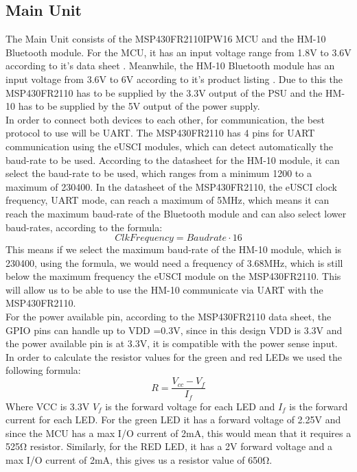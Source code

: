 \subsection{Main Unit}The Main Unit consists of the MSP430FR2110IPW16 MCU and the HM-10 Bluetooth module. For the MCU, it has an input voltage range from 1.8\si{\V} to 3.6\si{\V} according to it's data sheet \cite{MSP430FR2110IPW16R}. Meanwhile, the HM-10 Bluetooth module has an input voltage from 3.6\si{\V} to 6\si{\V} according to it's product listing \cite{AmazonComHiLetgo}. Due to this the MSP430FR2110 has to be supplied by the 3.3\si{V} output of the PSU and the HM-10 has to be supplied by the 5\si{\V} output of the power supply.\\
In order to connect both devices to each other, for communication, the best protocol to use will be UART. The MSP430FR2110 has 4 pins for UART communication using the eUSCI modules, which can detect automatically the baud-rate to be used. According to the datasheet for the HM-10 module\cite{AmazonComHiLetgo}, it can select the baud-rate to be used, which ranges from a minimum 1200 to a maximum of 230400. In the datasheet of the MSP430FR2110, the eUSCI clock frequency, UART mode, can reach a maximum of 5MHz, which means it can reach the maximum baud-rate of the Bluetooth module and can also select lower baud-rates, according to the formula:
\begin{equation}
	Clk Frequency = Baudrate \cdot 16
	\label{eq:UART Frequency}
\end{equation}
This means if we select the maximum baud-rate of the HM-10 module, which is 230400, using the formula, we would need a frequency of 3.68MHz, which is still below the maximum frequency the eUSCI module on the MSP430FR2110. This will allow us to be able to use the HM-10 communicate via UART with the MSP430FR2110.\\
For the power available pin, according to the MSP430FR2110 data sheet, the GPIO pins can handle up to VDD =0.3\si{\V}, since in this design VDD is 3.3\si{\V} and the power available pin is at 3.3\si{\V}, it is compatible with the power sense input.\\
In order to calculate the resistor values for the green and red LEDs we used the following formula:
\begin{equation}
R = \frac{V_{cc} - V_{f}}{I_{f}}
\end{equation}
Where VCC is 3.3\si{\V} $V_{f}$ is the forward voltage for each LED and $I_{f}$ is the forward current for each LED. For the green LED \cite{GreenDiffused5mmStandard} it has a forward voltage of 2.25\si{\V} and since the MCU has a max I/O current of 2\si{\mA}, this would mean that it requires a 525\si{\ohm} resistor. Similarly, for the RED LED, it has a 2\si{\V} forward voltage and a max I/O current of 2\si{\mA}, this gives us a resistor value of  650\si{\ohm}.\\\\
